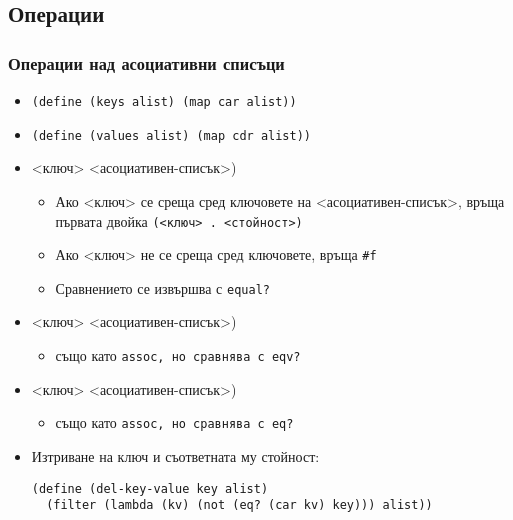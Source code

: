 \documentclass{beamer}
\begin{document}
\subsection{Операции}

\begin{frame}[fragile]
  \frametitle{Операции над асоциативни списъци}

  \begin{itemize}[<+->]
  \item \tt{(define (keys alist) (map car alist))}
  \item \tt{(define (values alist) (map cdr alist))}
  \item {}<ключ> <асоциативен-списък>\tta)
    \begin{itemize}[<.->]
    \item Ако <ключ> се среща сред ключовете на <асоциативен-списък>,
      връща първата двойка \tt(<ключ> \tt. <стойност>\tt)
    \item Ако <ключ> не се среща сред ключовете, връща \tt{\#f}
    \item Сравнението се извършва с \tt{equal?}
    \end{itemize}
  \item {}<ключ> <асоциативен-списък>\tta)
    \begin{itemize}[<.->]
    \item също като \tt{assoc}, но сравнява с \tt{eqv?}
    \end{itemize}
  \item {}<ключ> <асоциативен-списък>\tta)
    \begin{itemize}[<.->]
    \item също като \tt{assoc}, но сравнява с \tt{eq?}
    \end{itemize}
  \item Изтриване на ключ и съответната му стойност:\\
    \onslide<+->
\begin{verbatim}
(define (del-key-value key alist)
  (filter (lambda (kv) (not (eq? (car kv) key))) alist))
\end{verbatim}
  \end{itemize}
\end{frame}
\end{document}
